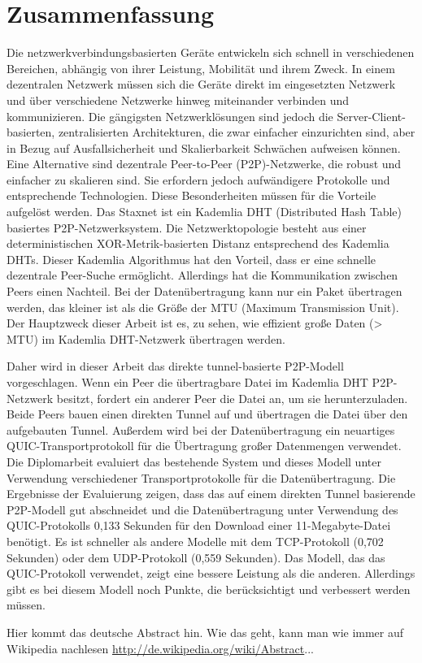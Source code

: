 \chapter*{Zusammenfassung}
\label{cha:zusammenfassung}

Die netzwerkverbindungsbasierten Geräte entwickeln sich schnell in verschiedenen Bereichen, abhängig von ihrer Leistung, Mobilität und ihrem Zweck. In einem dezentralen Netzwerk müssen sich die Geräte direkt im eingesetzten Netzwerk und über verschiedene Netzwerke hinweg miteinander verbinden und kommunizieren. Die gängigsten Netzwerklösungen sind jedoch die Server-Client-basierten, zentralisierten Architekturen, die zwar einfacher einzurichten sind, aber in Bezug auf Ausfallsicherheit und Skalierbarkeit Schwächen aufweisen können. Eine Alternative sind dezentrale Peer-to-Peer (P2P)-Netzwerke, die robust und einfacher zu skalieren sind. Sie erfordern jedoch aufwändigere Protokolle und entsprechende Technologien. Diese Besonderheiten müssen für die Vorteile aufgelöst werden. Das Staxnet ist ein Kademlia DHT (Distributed Hash Table) basiertes P2P-Netzwerksystem. Die Netzwerktopologie besteht aus einer deterministischen XOR-Metrik-basierten Distanz entsprechend des Kademlia DHTs. Dieser Kademlia Algorithmus hat den Vorteil, dass er eine schnelle dezentrale Peer-Suche ermöglicht. Allerdings hat die Kommunikation zwischen Peers einen Nachteil. Bei der Datenübertragung kann nur ein Paket übertragen werden, das kleiner ist als die Größe der MTU (Maximum Transmission Unit). Der Hauptzweck dieser Arbeit ist es, zu sehen, wie effizient große Daten (> MTU) im Kademlia DHT-Netzwerk übertragen werden.

Daher wird in dieser Arbeit das direkte tunnel-basierte P2P-Modell vorgeschlagen. Wenn ein Peer die übertragbare Datei im Kademlia DHT P2P-Netzwerk besitzt, fordert ein anderer Peer die Datei an, um sie herunterzuladen. Beide Peers bauen einen direkten Tunnel auf und übertragen die Datei über den aufgebauten Tunnel. Außerdem wird bei der Datenübertragung ein neuartiges QUIC-Transportprotokoll für die Übertragung großer Datenmengen verwendet. Die Diplomarbeit evaluiert das bestehende System und dieses Modell unter Verwendung verschiedener Transportprotokolle für die Datenübertragung. Die Ergebnisse der Evaluierung zeigen, dass das auf einem direkten Tunnel basierende P2P-Modell gut abschneidet und die Datenübertragung unter Verwendung des QUIC-Protokolls 0,133 Sekunden für den Download einer 11-Megabyte-Datei benötigt. Es ist schneller als andere Modelle mit dem TCP-Protokoll (0,702 Sekunden) oder dem UDP-Protokoll (0,559 Sekunden). Das Modell, das das QUIC-Protokoll verwendet, zeigt eine bessere Leistung als die anderen. Allerdings gibt es bei diesem Modell noch Punkte, die berücksichtigt und verbessert werden müssen.

Hier kommt das deutsche Abstract hin. Wie das geht, kann man wie immer auf Wikipedia nachlesen \url{http://de.wikipedia.org/wiki/Abstract}...